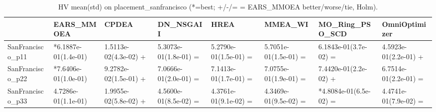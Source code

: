 \begin{table}[t]
\centering
\caption{HV mean(std) on placement_sanfrancisco (*=best; +/-/= = EARS_MMOEA better/worse/tie, Holm).}
\label{tab:placement_sanfrancisco_HV}
\begin{tabular}{llllllll}
\toprule
 & EARS\_MMOEA & CPDEA & DN\_NSGAII & HREA & MMEA\_WI & MO\_Ring\_PSO\_SCD & OmniOptimizer \\
\midrule
SanFrancisco\_p11 & *6.1887e-01(1.4e-01) & 1.5113e-02(4.3e-02) + & 5.3073e-01(1.8e-01) = & 5.2790e-01(1.5e-01) = & 5.7051e-01(1.5e-01) = & 6.1843e-01(3.7e-02) = & 4.5923e-01(2.2e-01) + \\
SanFrancisco\_p22 & *7.6406e-01(1.0e-01) & 9.2782e-02(1.5e-01) + & 7.0666e-01(2.0e-01) = & 7.1413e-01(1.7e-01) = & 7.0755e-01(1.9e-01) = & 7.4420e-01(2.2e-02) + & 6.7514e-01(2.2e-01) = \\
SanFrancisco\_p33 & 4.7286e-01(1.1e-01) & 1.9955e-02(5.8e-02) + & 4.5600e-01(8.5e-02) = & 4.3761e-01(9.1e-02) = & 4.3469e-01(9.5e-02) = & *4.8084e-01(6.5e-02) = & 4.4741e-01(7.9e-02) = \\
\bottomrule
\end{tabular}
\end{table}

